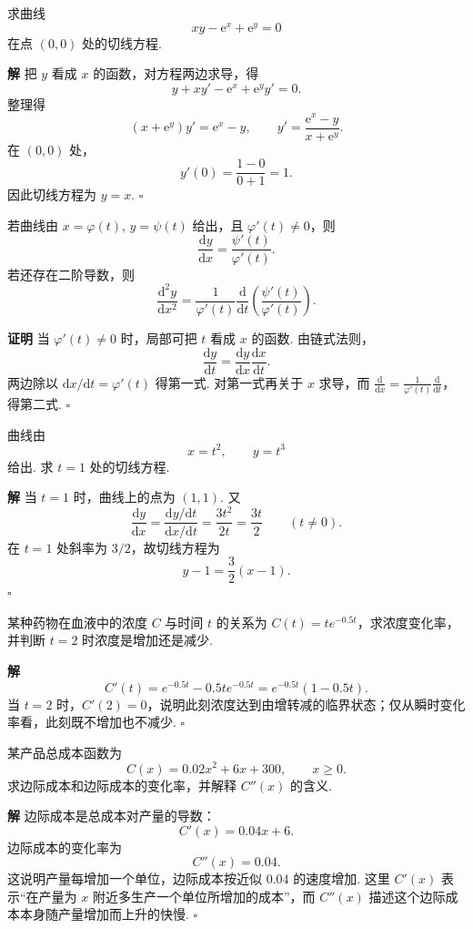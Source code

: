 \documentclass[fontset=fandol]{ctexart}
\newenvironment{proofdetail}{\par\noindent\textbf{证明}\quad}{\hfill$\square$\par\vspace{0.8em}}
\newenvironment{solution}{\par\noindent\textbf{解}\quad}{\hfill$\square$\par\vspace{0.8em}}
\newcommand{\dd}{\mathrm{d}}
\newcommand{\ee}{\mathrm{e}}
\begin{document}
\begin{example}[隐函数切线]
求曲线
\[
xy-\ee^x+\ee^y=0
\]
在点 $(0,0)$ 处的切线方程.
\end{example}
\begin{solution}
把 $y$ 看成 $x$ 的函数，对方程两边求导，得
\[
y+xy'-\ee^x+\ee^y y'=0.
\]
整理得
\[
(x+\ee^y)y'=\ee^x-y,\qquad
y'=\frac{\ee^x-y}{x+\ee^y}.
\]
在 $(0,0)$ 处，
\[
y'(0)=\frac{1-0}{0+1}=1.
\]
因此切线方程为 $y=x$.
\end{solution}

\begin{proposition}[参数方程求导]
若曲线由 $x=\varphi(t),\,y=\psi(t)$ 给出，且 $\varphi'(t)\neq0$，则
\[
\frac{\dd y}{\dd x}=\frac{\psi'(t)}{\varphi'(t)}.
\]
若还存在二阶导数，则
\[
\frac{\dd^2y}{\dd x^2}
=\frac{1}{\varphi'(t)}\frac{\dd}{\dd t}\left(\frac{\psi'(t)}{\varphi'(t)}\right).
\]
\end{proposition}
\begin{proofdetail}
当 $\varphi'(t)\neq0$ 时，局部可把 $t$ 看成 $x$ 的函数. 由链式法则，
\[
\frac{\dd y}{\dd t}=\frac{\dd y}{\dd x}\frac{\dd x}{\dd t}.
\]
两边除以 $\dd x/\dd t=\varphi'(t)$ 得第一式. 对第一式再关于 $x$ 求导，而 $\frac{\dd}{\dd x}=\frac1{\varphi'(t)}\frac{\dd}{\dd t}$，得第二式.
\end{proofdetail}

\begin{example}[参数方程求切线]
曲线由
\[
x=t^2,\qquad y=t^3
\]
给出. 求 $t=1$ 处的切线方程.
\end{example}
\begin{solution}
当 $t=1$ 时，曲线上的点为 $(1,1)$. 又
\[
\frac{\dd y}{\dd x}
=\frac{\dd y/\dd t}{\dd x/\dd t}
=\frac{3t^2}{2t}
=\frac{3t}{2}\qquad(t\neq0).
\]
在 $t=1$ 处斜率为 $3/2$，故切线方程为
\[
y-1=\frac32(x-1).
\]
\end{solution}

\begin{example}[增长率]
某种药物在血液中的浓度 $C$ 与时间 $t$ 的关系为 $C(t)=te^{-0.5t}$，求浓度变化率，并判断 $t=2$ 时浓度是增加还是减少.
\end{example}
\begin{solution}
\[
C'(t)=e^{-0.5t}-0.5te^{-0.5t}=e^{-0.5t}(1-0.5t).
\]
当 $t=2$ 时，$C'(2)=0$，说明此刻浓度达到由增转减的临界状态；仅从瞬时变化率看，此刻既不增加也不减少.
\end{solution}

\begin{example}[边际成本变化率]
某产品总成本函数为
\[
C(x)=0.02x^2+6x+300,\qquad x\geq0.
\]
求边际成本和边际成本的变化率，并解释 $C''(x)$ 的含义.
\end{example}
\begin{solution}
边际成本是总成本对产量的导数：
\[
C'(x)=0.04x+6.
\]
边际成本的变化率为
\[
C''(x)=0.04.
\]
这说明产量每增加一个单位，边际成本按近似 $0.04$ 的速度增加. 这里 $C'(x)$ 表示“在产量为 $x$ 附近多生产一个单位所增加的成本”，而 $C''(x)$ 描述这个边际成本本身随产量增加而上升的快慢.
\end{solution}
\end{document}
